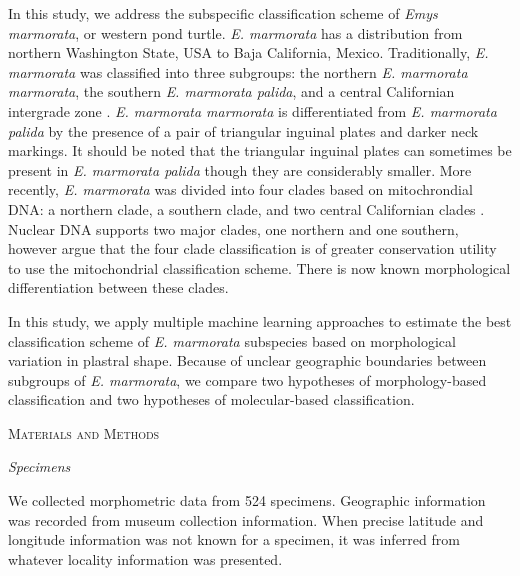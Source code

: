 \documentclass[12pt,letterpaper]{article}\usepackage{graphicx, color}
\renewcommand{\section}[1]{%
\bigskip
\begin{center}
\begin{Large}
\normalfont\scshape #1
\medskip
\end{Large}
\end{center}}
\renewcommand{\subsection}[1]{%
\bigskip
\begin{center}
\begin{large}
\normalfont\itshape #1
\end{large}
\end{center}}
\begin{document}
In this study, we address the subspecific classification scheme of \textit{Emys marmorata}, or western pond turtle. \textit{E. marmorata} has a distribution from northern Washington State, USA to Baja California, Mexico.
Traditionally, \textit{E. marmorata} was classified into three subgroups: the northern \textit{E. marmorata marmorata}, the southern \textit{E. marmorata palida}, and a central Californian intergrade zone \citep{Seeliger1945}. \textit{E. marmorata marmorata} is differentiated from \textit{E. marmorata palida} by the presence of a pair of triangular inguinal plates and darker neck markings. It should be noted that the triangular inguinal plates can sometimes be present in \textit{E. marmorata palida} though they are considerably smaller.
More recently, \textit{E. marmorata} was divided into four clades based on mitochrondial DNA: a northern clade, a southern clade, and two central Californian clades \citep{Spinks2005,Spinks2010}. Nuclear DNA supports two major clades, one northern and one southern, however \citet{Spinks2010} argue that the four clade classification is of greater conservation utility to use the mitochondrial classification scheme.
There is now known morphological differentiation between these clades.

In this study, we apply multiple machine learning approaches to estimate the best classification scheme of \textit{E. marmorata} subspecies based on morphological variation in plastral shape. Because of unclear geographic boundaries between subgroups of \textit{E. marmorata}, we compare two hypotheses of morphology-based classification and two hypotheses of molecular-based classification.


\section{Materials and Methods}
\subsection{Specimens}
We collected morphometric data from 524 specimens. Geographic information was recorded from museum collection information. When precise latitude and longitude information was not known for a specimen, it was inferred from whatever locality information was presented. %
\end{document}
